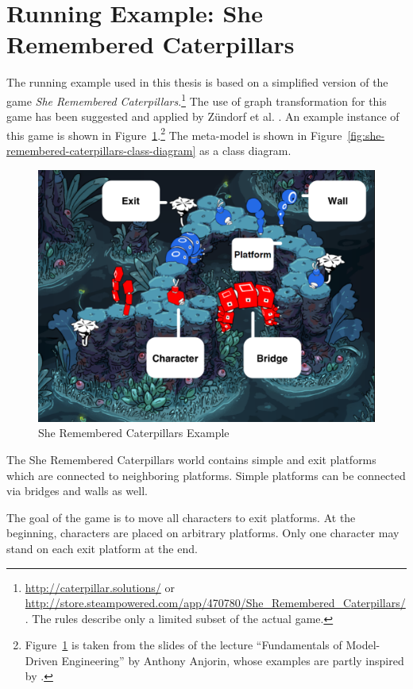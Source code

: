 \section{Running Example: She Remembered Caterpillars}
\label{running-example}
The running example used in this thesis is based on a simplified version of the game \textit{She Remembered Caterpillars}.\footnote{\url{http://caterpillar.solutions/} or  \url{http://store.steampowered.com/app/470780/She_Remembered_Caterpillars/}. The rules describe only a limited subset of the actual game.}
The use of graph transformation for this game has been suggested and applied by Zündorf et al. \cite{UsingGTforPuzzleGame}.
An example instance of this game is shown in Figure~\ref{fig:she-remembered-caterpillars-example}.\footnote{Figure~\ref{fig:she-remembered-caterpillars-example} is taken from the slides of the lecture ``Fundamentals of Model-Driven Engineering'' by Anthony Anjorin, whose examples are partly inspired by \cite{UsingGTforPuzzleGame}.}
The meta-model is shown in Figure~\ref{fig:she-remembered-caterpillars-class-diagram} as a class diagram.

\begin{figure}[h!]
	\centering
	\includegraphics[width=.5\linewidth]{../common/figures/she-remembered-caterpillars-game}
	\caption{She Remembered Caterpillars Example}
	\label{fig:she-remembered-caterpillars-example}
\end{figure}

The She Remembered Caterpillars world contains simple and exit platforms which are connected to neighboring platforms.
Simple platforms can be connected via bridges and walls as well.

The goal of the game is to move all characters to exit platforms.
At the beginning, characters are placed on arbitrary platforms.
Only one character may stand on each exit platform at the end.

